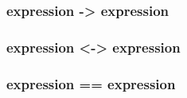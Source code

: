 \documentclass[12pt]{article}
\begin{document}
\subsubsection{expression -> expression}
\subsubsection{expression <-> expression}
\subsubsection{expression == expression}
\end{document}
